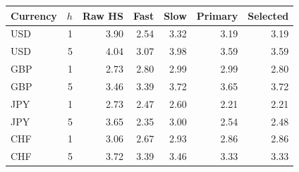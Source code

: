 \begin{tabular}{lrrrrrr}
\toprule
Currency & $h$ & Raw HS & Fast & Slow & Primary & Selected \\
\midrule
USD & 1 & 3.90 & 2.54 & 3.32 & 3.19 & 3.19 \\
USD & 5 & 4.04 & 3.07 & 3.98 & 3.59 & 3.59 \\
GBP & 1 & 2.73 & 2.80 & 2.99 & 2.99 & 2.80 \\
GBP & 5 & 3.46 & 3.39 & 3.72 & 3.65 & 3.72 \\
JPY & 1 & 2.73 & 2.47 & 2.60 & 2.21 & 2.21 \\
JPY & 5 & 3.65 & 2.35 & 3.00 & 2.54 & 2.48 \\
CHF & 1 & 3.06 & 2.67 & 2.93 & 2.86 & 2.86 \\
CHF & 5 & 3.72 & 3.39 & 3.46 & 3.33 & 3.33 \\
\bottomrule
\end{tabular}
